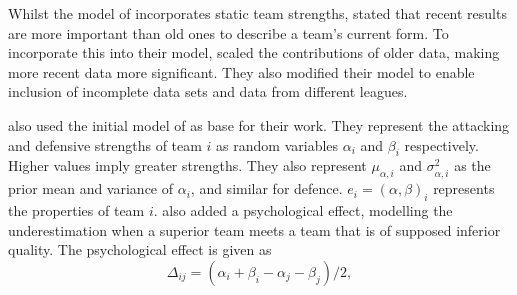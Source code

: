 Whilst the model of \citet{bib:maher-1982} incorporates static team strengths, \citet{bib:dixon-coles-1997} stated that recent results are more important than old ones to describe a team's current form. To incorporate this into their model, \citet{bib:dixon-coles-1997} scaled the contributions of older data, making more recent data more significant. They also modified their model to enable inclusion of incomplete data sets and data from different leagues.

\citet{bib:rue-salvesen-2000} also used the initial model of \citeauthor{bib:maher-1982} as base for their work. They represent the attacking and defensive strengths of team $i$ as random variables $\alpha_{i}$ and $\beta_{i}$ respectively. Higher values imply greater strengths. They also represent $\mu_{\alpha, i}$ and $\sigma^2_{\alpha, i}$ as the prior mean and variance of $\alpha_{i}$, and similar for defence. $e_{i} = (\alpha, \beta)_{i}$ represents the properties of team $i$. \citet{bib:rue-salvesen-2000} also added a psychological effect, modelling the underestimation when a superior team meets a team that is of supposed inferior quality. The psychological effect is given as
\begin{equation*}
    \Delta_{ij} = (\alpha_{i} + \beta_{i} - \alpha_{j} - \beta_{j}) / 2,
\end{equation*}
